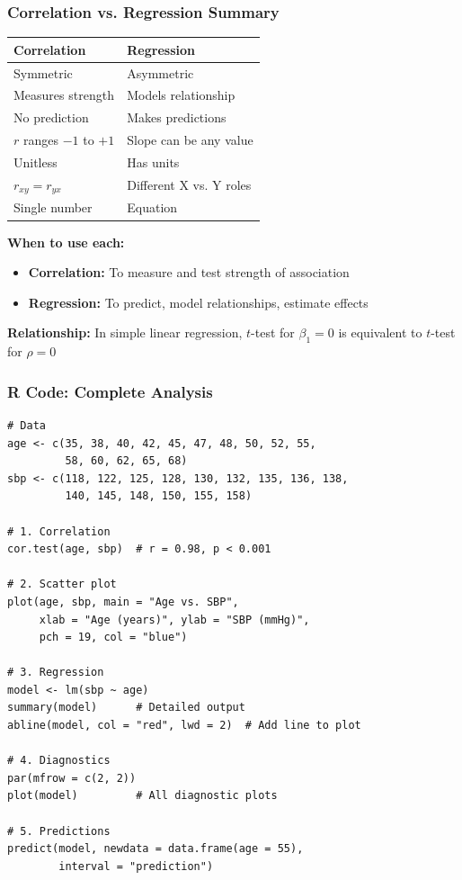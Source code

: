 \documentclass{beamer}
\begin{document}
\begin{frame}
\frametitle{Correlation vs. Regression Summary}
\begin{center}
\begin{tabular}{p{4cm}p{4cm}}
\toprule
\textbf{Correlation} & \textbf{Regression} \\
\midrule
Symmetric & Asymmetric \\
Measures strength & Models relationship \\
No prediction & Makes predictions \\
$r$ ranges $-1$ to $+1$ & Slope can be any value \\
Unitless & Has units \\
$r_{xy} = r_{yx}$ & Different X vs. Y roles \\
Single number & Equation \\
\bottomrule
\end{tabular}
\end{center}

\vspace{0.3cm}
\textbf{When to use each:}
\begin{itemize}
\item \textbf{Correlation:} To measure and test strength of association
\item \textbf{Regression:} To predict, model relationships, estimate effects
\end{itemize}

\vspace{0.3cm}
\textbf{Relationship:} In simple linear regression, $t$-test for $\beta_1 = 0$ is equivalent to $t$-test for $\rho = 0$
\end{frame}

\begin{frame}[fragile]
\frametitle{R Code: Complete Analysis}
\footnotesize
\begin{verbatim}
# Data
age <- c(35, 38, 40, 42, 45, 47, 48, 50, 52, 55,
         58, 60, 62, 65, 68)
sbp <- c(118, 122, 125, 128, 130, 132, 135, 136, 138,
         140, 145, 148, 150, 155, 158)

# 1. Correlation
cor.test(age, sbp)  # r = 0.98, p < 0.001

# 2. Scatter plot
plot(age, sbp, main = "Age vs. SBP",
     xlab = "Age (years)", ylab = "SBP (mmHg)",
     pch = 19, col = "blue")

# 3. Regression
model <- lm(sbp ~ age)
summary(model)      # Detailed output
abline(model, col = "red", lwd = 2)  # Add line to plot

# 4. Diagnostics
par(mfrow = c(2, 2))
plot(model)         # All diagnostic plots

# 5. Predictions
predict(model, newdata = data.frame(age = 55),
        interval = "prediction")
\end{verbatim}
\end{frame}
\end{document}
